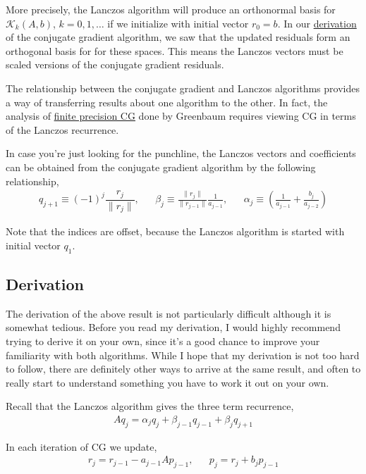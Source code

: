 \documentclass[10pt]{article}
\begin{document}
More precisely, the Lanczos algorithm will produce an orthonormal basis for \(\mathcal{K}_k(A,b)\), \(k=0,1,\ldots\) if we initialize with initial vector \(r_0 = b\).
In our \href{./cg_derivation.html}{derivation} of the conjugate gradient algorithm, we saw that the updated residuals form an orthogonal basis for for these spaces.
This means the Lanczos vectors must be scaled versions of the conjugate gradient residuals.

The relationship between the conjugate gradient and Lanczos algorithms provides a way of transferring results about one algorithm to the other.
In fact, the analysis of \href{./finite_precision_cg.html}{finite precision CG} done by Greenbaum requires viewing CG in terms of the Lanczos recurrence.

In case you're just looking for the punchline, the Lanczos vectors and coefficients can be obtained from the conjugate gradient algorithm by the following relationship,
\begin{align*}
q_{j+1} \equiv (-1)^j\dfrac{r_j}{\|r_j\|}
,&&
\beta_j \equiv \frac{\|r_j\|}{\|r_{j-1}\|}\frac{1}{a_{j-1}}
,&&
\alpha_j \equiv \left(\frac{1}{a_{j-1}} + \frac{b_{j}}{a_{j-2}}\right)
\end{align*}

Note that the indices are offset, because the Lanczos algorithm is started with initial vector \(q_1\).

\subsection{Derivation}

The derivation of the above result is not particularly difficult although it is somewhat tedious.
Before you read my derivation, I would highly recommend trying to derive it on your own, since it's a good chance to improve your familiarity with both algorithms.
While I hope that my derivation is not too hard to follow, there are definitely other ways to arrive at the same result, and often to really start to understand something you have to work it out on your own.

Recall that the Lanczos algorithm gives the three term recurrence,
\begin{align*}
Aq_j = \alpha_j q_j + \beta_{j-1}q_{j-1} + \beta_j q_{j+1}
\end{align*}

In each iteration of CG we update,
\begin{align*}
r_j = r_{j-1} - a_{j-1} Ap_{j-1}
,&&
p_j = r_j + b_j p_{j-1}
\end{align*}
\end{document}
